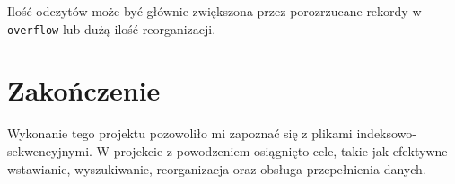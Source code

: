 \documentclass{article}
\begin{document}
    \noindent Ilość odczytów może być głównie zwiększona przez porozrzucane rekordy w \texttt{overflow} lub dużą ilość reorganizacji.

    \section*{Zakończenie}

    Wykonanie tego projektu pozowoliło mi zapoznać się z plikami indeksowo-sekwencyjnymi. W projekcie z powodzeniem osiągnięto cele, takie jak efektywne wstawianie, wyszukiwanie, reorganizacja oraz obsługa przepełnienia danych.
   
\end{document}
